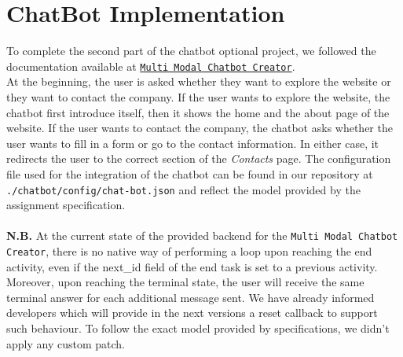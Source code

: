 \documentclass[12pt]{report}
\begin{document}
\chapter{ChatBot Implementation} 
To complete the second part of the chatbot optional project, we followed the documentation available at \href{https://gitlab.com/i3lab/mmcc/frontend/mmcc-vue/-/blob/master/README.md}{\texttt{Multi Modal Chatbot Creator}}.
\\At the beginning, the user is asked whether they want to explore the website or they want to contact the company.
If the user wants to explore the website, the chatbot first introduce itself, then it shows the home and the about page of the website.
If the user wants to contact the company, the chatbot asks whether the user wants to fill in a form or go to the contact information.
In either case, it redirects the user to the correct section of the \emph{Contacts} page. The configuration file used for the integration of the chatbot can be found in our repository at \texttt{./chatbot/config/chat-bot.json} and reflect the model provided by the assignment specification.\\\\
\textbf{N.B.} At the current state of the provided backend for the \texttt{Multi Modal Chatbot Creator}, there is no native way of performing a loop upon reaching the end activity, even if the next\_id field of the 
end task is set to a previous activity. Moreover, upon reaching the terminal state, the user will receive the same terminal answer for each additional message sent. We have already informed developers which 
will provide in the next versions a reset callback to support such behaviour. To follow the exact model provided by specifications, we didn't apply any custom patch.
\end{document}
